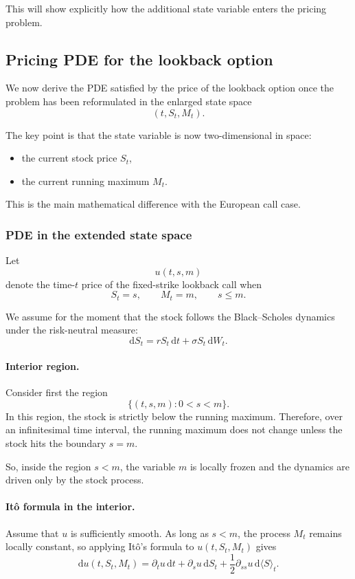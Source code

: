 \documentclass[11pt]{article}
\theoremstyle{plain}
\theoremstyle{definition}
\theoremstyle{remark}
\begin{document}
This will show explicitly how the additional state variable enters the
pricing problem.

\subsection{Pricing PDE for the lookback option}

We now derive the PDE satisfied by the price of the lookback option once
the problem has been reformulated in the enlarged state space
\[
(t,S_t,M_t).
\]

The key point is that the state variable is now two-dimensional in
space:
\begin{itemize}[leftmargin=1.4em]
    \item the current stock price \(S_t\),
    \item the current running maximum \(M_t\).
\end{itemize}

This is the main mathematical difference with the European call case.

\subsubsection{PDE in the extended state space}

Let
\[
u(t,s,m)
\]
denote the time-\(t\) price of the fixed-strike lookback call when
\[
S_t=s,
\qquad
M_t=m,
\qquad
s\le m.
\]

We assume for the moment that the stock follows the Black--Scholes
dynamics under the risk-neutral measure:
\[
\mathrm{d}S_t=rS_t\,\mathrm{d}t+\sigma S_t\,\mathrm{d}W_t.
\]

\paragraph{Interior region.}
Consider first the region
\[
\{(t,s,m): 0<s<m\}.
\]
In this region, the stock is strictly below the running maximum.
Therefore, over an infinitesimal time interval, the running maximum does
not change unless the stock hits the boundary \(s=m\).

So, inside the region \(s<m\), the variable \(m\) is locally frozen and
the dynamics are driven only by the stock process.

\paragraph{It\^o formula in the interior.}
Assume that \(u\) is sufficiently smooth.
As long as \(s<m\), the process \(M_t\) remains locally constant, so
applying It\^o's formula to \(u(t,S_t,M_t)\) gives
\[
\mathrm{d}u(t,S_t,M_t)
=
\partial_t u\,\mathrm{d}t
+
\partial_s u\,\mathrm{d}S_t
+
\frac12 \partial_{ss}u\,\mathrm{d}\langle S\rangle_t.
\]
\end{document}

